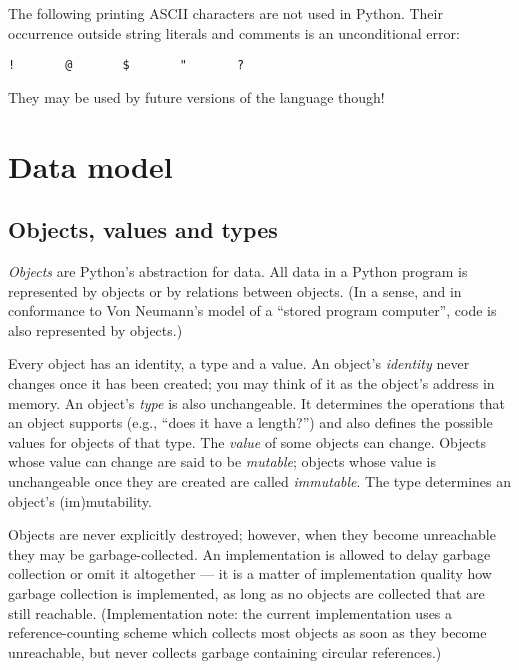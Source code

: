 The following printing ASCII characters are not used in Python.  Their
occurrence outside string literals and comments is an unconditional
error:

\begin{verbatim}
!       @       $       "       ?
\end{verbatim}

They may be used by future versions of the language though!

\chapter{Data model}

\section{Objects, values and types}

{\em Objects} are Python's abstraction for data.  All data in a Python
program is represented by objects or by relations between objects.
(In a sense, and in conformance to Von Neumann's model of a
``stored program computer'', code is also represented by objects.)

Every object has an identity, a type and a value.  An object's {\em
identity} never changes once it has been created; you may think of it
as the object's address in memory.  An object's {\em type} is also
unchangeable.  It determines the operations that an object supports
(e.g., ``does it have a length?'') and also defines the possible
values for objects of that type.  The {\em value} of some objects can
change.  Objects whose value can change are said to be {\em mutable};
objects whose value is unchangeable once they are created are called
{\em immutable}.  The type determines an object's (im)mutability.

Objects are never explicitly destroyed; however, when they become
unreachable they may be garbage-collected.  An implementation is
allowed to delay garbage collection or omit it altogether --- it is a
matter of implementation quality how garbage collection is
implemented, as long as no objects are collected that are still
reachable.  (Implementation note: the current implementation uses a
reference-counting scheme which collects most objects as soon as they
become unreachable, but never collects garbage containing circular
references.)

